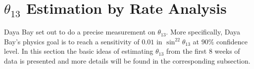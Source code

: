 




\section{\texorpdfstring{$\theta_{13}$}{Theta13} Estimation by Rate Analysis}
Daya Bay set out to do a precise measurement on $\theta_{13}$. More specifically, Daya Bay's physics goal is to reach a sensitivity of $0.01$ in $\sin^22\theta_{13}$ at $90\%$ confidence level. In this section the basic ideas of estimating $\theta_{13}$ from the first 8 weeks of data is presented and more details will be found in the corresponding subsection.

